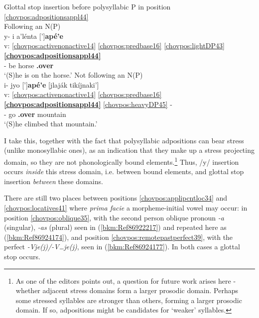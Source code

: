 \documentclass[output=paper]{langscibook}
\begin{document}
\ea\label{bkm:Ref86079447}Glottal stop insertion before polysyllabic P in position \ref{chovpos:adpositionsappl44}\\
    \ea  Following an N(P)\\ {
    \glll {} y- i a'lénta [']\textbf{apé'e}\\ 
    v: \ref{chovpos:activenonactive14} \ref{chovpos:predbase16} \ref{chovpos:lightDP43} \textbf{\ref{chovpos:adpositionsappl44}} \\ 
    {} \Third{}- be horse \textbf{\Ap.over}\\
    \glt `(S)he is on the horse.'
    }
    \ex  Not following an N(P)\\ {
    \glll {} i{}- jyo [']\textbf{apé'e} [jlaják tikíjnaki']\\
    v: \ref{chovpos:activenonactive14} \ref{chovpos:predbase16} \textbf{\ref{chovpos:adpositionsappl44}} \ref{chovpos:heavyDP45} - \\ 
    {} \Third{}- go \textbf{\Ap.over} \Dem{} mountain\\ 
    \glt `(S)he climbed that mountain.'
    }
    \z 
\z 

I take this, together with the fact that polysyllabic adpositions can bear stress (unlike monosyllabic ones), as an indication that they make up a stress projecting domain, so they are not phonologically bound elements.\footnote{As one of the editors points out, a question for future work arises here - whether adjacent stress domains form a larger prosodic domain. Perhaps some stressed syllables are stronger than others, forming a larger prosodic domain. If so, adpositions might be candidates for `weaker' syllables.} Thus, /y/ insertion occurs \textit{inside} this stress domain, i.e. between bound elements, and glottal stop insertion \textit{between} these domains.

There are still two places between positions \ref{chovpos:applipcntloc34} and \ref{chovpos:locatives41} where \textit{prima facie} a morpheme-initial vowel may occur: in position \ref{chovpos:oblique35}, with the second person oblique pronoun \textit{-a} (singular), \textit{-as} (plural) seen in (\ref{bkm:Ref86922217}) and repeated here as (\ref{bkm:Ref86924174}), and position \ref{chovpos:remotepastperfect39}, with the perfect \textit{{}-Vje(j)/-V…je(j)}, seen in (\ref{bkm:Ref86924177}). In both cases a glottal stop occurs. 
\end{document}
